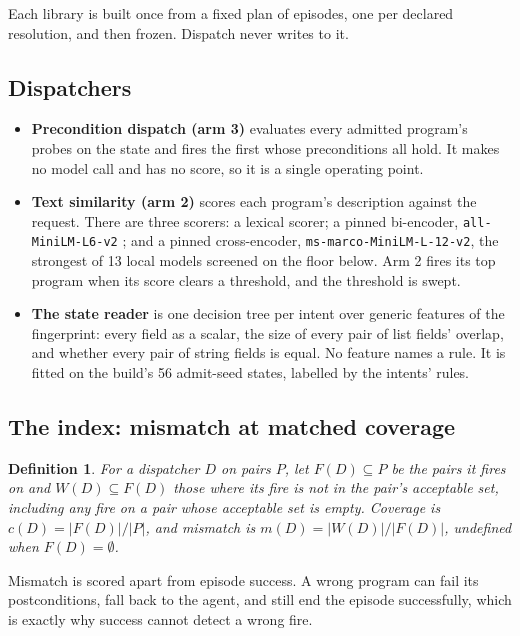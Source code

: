 \documentclass[11pt]{article}
\newcommand{\code}[1]{\texttt{#1}}
\newtheorem{definition}{Definition}
\begin{document}
Each library is built once from a fixed plan of episodes, one per declared resolution, and then
frozen. Dispatch never writes to it.

\subsection{Dispatchers}

\begin{itemize}
  \item \textbf{Precondition dispatch (arm 3)} evaluates every admitted program's probes on the
  state and fires the first whose preconditions all hold. It makes no model call and has no
  score, so it is a single operating point.
  \item \textbf{Text similarity (arm 2)} scores each program's description against the request.
  There are three scorers: a lexical scorer; a pinned bi-encoder, \code{all-MiniLM-L6-v2}
  \cite{reimers2019sbert}; and a pinned cross-encoder, \code{ms-marco-MiniLM-L-12-v2}, the
  strongest of 13 local models screened on the floor below. Arm 2 fires its top program when
  its score clears a threshold, and the threshold is swept.
  \item \textbf{The state reader} is one decision tree per intent over generic features of the
  fingerprint: every field as a scalar, the size of every pair of list fields' overlap, and
  whether every pair of string fields is equal. No feature names a rule. It is fitted on the
  build's 56 admit-seed states, labelled by the intents' rules.
\end{itemize}

\subsection{The index: mismatch at matched coverage}

\begin{definition}
For a dispatcher $D$ on pairs $P$, let $F(D)\subseteq P$ be the pairs it fires on and $W(D)
\subseteq F(D)$ those where its fire is not in the pair's acceptable set, including any fire on a
pair whose acceptable set is empty. \emph{Coverage} is $c(D)=|F(D)|/|P|$, and \emph{mismatch} is
$m(D)=|W(D)|/|F(D)|$, undefined when $F(D)=\emptyset$.
\end{definition}

Mismatch is scored apart from episode success. A wrong program can fail its postconditions, fall
back to the agent, and still end the episode successfully, which is exactly why success cannot
detect a wrong fire.
\end{document}
